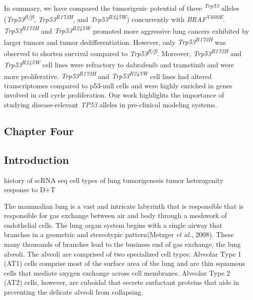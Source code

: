 In summary, we have compared the tumorigenic potential of three \emph{\textsuperscript{Trp53}} alleles (\emph{Trp53\textsuperscript{fl/fl}}, \emph{Trp53\textsuperscript{R172H}}, and \emph{Trp53\textsuperscript{R245W}}) concurrently with \emph{BRAF\textsuperscript{V600E}}. \emph{Trp53\textsuperscript{R172H}} and \emph{Trp53\textsuperscript{R245W}} promoted more aggressive lung cancers exhibited by larger tumors and tumor dedifferentiation. However, only \emph{Trp53\textsuperscript{R172H}} was observed to shorten survival compared to \emph{Trp53\textsuperscript{fl/fl}}. Moreover, \emph{Trp53\textsuperscript{R172H}} and \emph{Trp53\textsuperscript{R245W}} cell lines were refractory to dabrafenib and trametinib and were more proliferative. \emph{Trp53\textsuperscript{R172H}} and \emph{Trp53\textsuperscript{R245W}} cell lines had altered transcriptomes compared to p53-null cells and were highly enriched in genes involved in cell cycle proliferation. Our work highlights the importance of studying disease-relevant \emph{TP53} alleles in pre-clinical modeling systems.

\hypertarget{chapter-four}{%
\subsection{Chapter Four}\label{chapter-four}}

\hypertarget{introduction-2}{%
\subsection{Introduction}\label{introduction-2}}

history of scRNA seq
cell types of lung tumorigenesis
tumor heterogenity
response to D+T

The mammalian lung is a vast and intricate labyrinth that is responsible that is responsible for gas exchange between air and body through a meshwork of endothelial cells. The lung organ system begins with a single airway that branches in a geometric and stereotypic pattern(Metzger \emph{et al.}, 2008). These many thousands of branches lead to the business end of gas exchange, the lung alveoli. The alveoli are comprised of two specialized cell types: Alveolar Type 1 (AT1) cells comprise most of the surface area of the lung and are thin squamous cells that mediate oxygen exchange across cell membranes. Alveolar Type 2 (AT2) cells, however, are cuboidal that secrete surfactant proteins that aide in preventing the delicate alveoli from collapsing.

